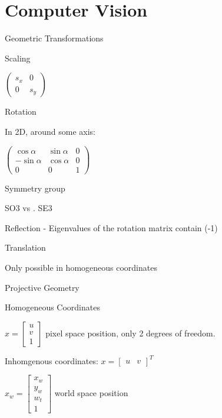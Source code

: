 \chapter{Computer Vision}

\begin{section}Geometric Transformations

\begin{subsubsection} Scaling 

$\left(  \begin{matrix} s_x & 0 \\ 0 & s_y  \end{matrix} \right)$

\begin{subsubsection} Rotation

In 2D, around some axis: 

$\left(  \begin{matrix} \cos  \alpha & \sin \alpha  & 0 \\  -\sin \alpha & \cos \alpha & 0 \\ 0 & 0 & 1  \end{matrix} \right)$

Symmetry group 

SO3 vs . SE3

Reflection - Eigenvalues of the rotation matrix contain (-1)

\begin{subsubsection} Translation

Only possible in homogeneous coordinates

\begin{section}{Projective Geometry}

\begin{subsection}{Homogeneous Coordinates}

$x = \left[\begin{matrix} u \\ v\\ 1 \end{matrix}\right]$ pixel space position, only 2 degrees of freedom.

Inhomgenous coordinates: $x = [\begin{matrix} u & v \end{matrix}]^T $

$ x_w = \left[ \begin{matrix} x_w \\  y_w \\ w_t\\  1 \end{matrix} \right] $ world space position


\end{subsection}
\end{section}
\end{subsubsection}
\end{subsubsection}
\end{subsubsection}
\end{section}
